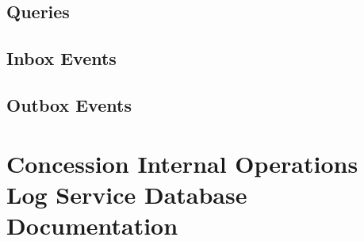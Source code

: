 \documentclass[letterpaper,10pt,english]{sphinxmanual}
\begin{document}
\subsection{Queries}
\label{\detokenize{crm_system/internal_operations_log_service:queries}}

\subsection{Inbox Events}
\label{\detokenize{crm_system/internal_operations_log_service:inbox-events}}

\subsection{Outbox Events}
\label{\detokenize{crm_system/internal_operations_log_service:outbox-events}}

\section{Concession Internal Operations Log Service Database Documentation}
\label{\detokenize{crm_system/internal_operations_log_service:concession-internal-operations-log-service-database-documentation}}


\renewcommand{\indexname}{Index}
\printindex
\end{document}
